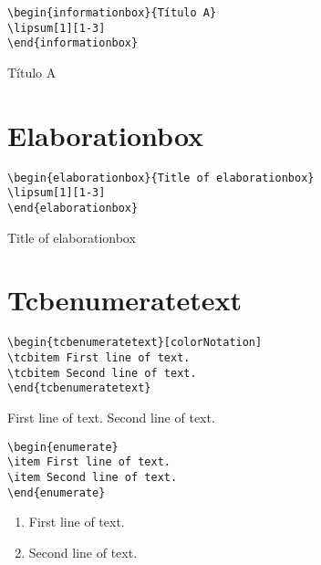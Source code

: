 \lipsum[1][1-3]

\begin{verbatim}
\begin{informationbox}{Título A}
\lipsum[1][1-3]
\end{informationbox}
\end{verbatim}
\begin{informationbox}{Título A}
\lipsum[1][1-3]
\end{informationbox}


\section{Elaborationbox}

\lipsum[1][1-3]

\begin{verbatim}
\begin{elaborationbox}{Title of elaborationbox}
\lipsum[1][1-3]
\end{elaborationbox}
\end{verbatim}
\begin{elaborationbox}{Title of elaborationbox}
\lipsum[1][1-3]
\end{elaborationbox}

\section{Tcbenumeratetext}

\begin{verbatim}
\begin{tcbenumeratetext}[colorNotation]
\tcbitem First line of text.
\tcbitem Second line of text.
\end{tcbenumeratetext}
\end{verbatim}
\begin{tcbenumeratetext}[colorNotation]
\tcbitem First line of text.
\tcbitem Second line of text.
\end{tcbenumeratetext}

\lipsum[1][1-3]

\begin{verbatim}
\begin{enumerate}
\item First line of text.
\item Second line of text.
\end{enumerate}
\end{verbatim}
\begin{enumerate}
\item First line of text.
\item Second line of text.
\end{enumerate}

